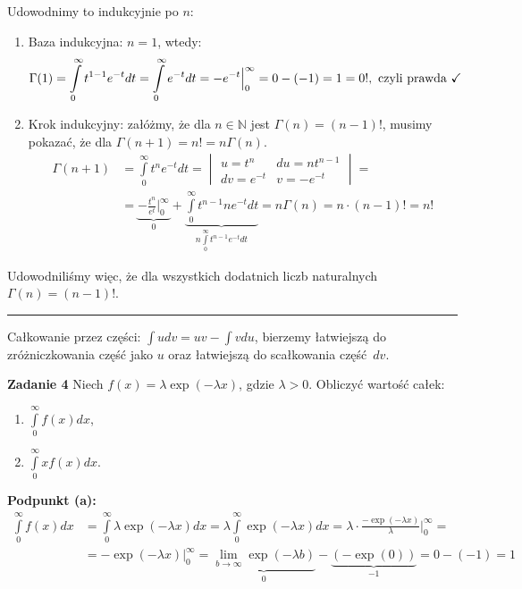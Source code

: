 \documentclass[a4paper,12pt]{article}
\begin{document}
\noindent Udowodnimy to indukcyjnie po $n$:
\begin{enumerate}
    \item Baza indukcyjna: $n=1$, wtedy:
    \[ 
        \Gamma(1) = \int\limits_{0}^{\infty} t^{1-1} e^{-t} dt = 
        \int\limits_{0}^{\infty} e^{-t} dt =
        -e^{-t} \Big{|}_0^\infty = 0 - (-1) = 1 = 0!, \text{ czyli prawda } \checkmark
    \]
    \item Krok indukcyjny: załóżmy, że dla $n \in \mathbb{N}$ jest $\Gamma(n) = (n-1)!$,
          musimy pokazać, że dla $\Gamma(n+1) = n! = n\Gamma(n)$.
    \begin{align*}
        \Gamma(n+1) &= \int\limits_{0}^{\infty} t^{n} e^{-t} dt =
        \begin{vmatrix}
            u = t^n         &   du = nt^{n-1}   \\
            dv = e^{-t}     &   v = -e^{-t}       
        \end{vmatrix} = \\
        &= \underbrace{- \frac{t^n}{e^t} \Big|_0^\infty}_{0}
        + \underbrace{\int\limits_{0}^{\infty} t^{n-1} n e^{-t} dt}_{
            n \int\limits_{0}^{\infty} t^{n-1} e^{-t} dt
        } 
        = n\Gamma(n) = n \cdot (n-1)! = n!
    \end{align*}
\end{enumerate}

\noindent Udowodniliśmy więc, że dla wszystkich dodatnich liczb naturalnych 
$\Gamma(n) = (n-1)!$.

\vspace*{\fill}
\noindent\rule{\textwidth}{1pt}
\noindent Całkowanie przez części: $\int udv = uv - \int vdu$, bierzemy łatwiejszą
do zróżniczkowania część jako $u$ oraz łatwiejszą do scałkowania część $dv$.


\newpage
\noindent \textbf{Zadanie 4} \newline
Niech $f(x) = \lambda \exp (-\lambda x)$, gdzie $\lambda > 0$. Obliczyć wartość całek:
\begin{enumerate}[label=(\alph*)]
    \item $\int\limits_{0}^{\infty} f(x) dx$,
    \item $\int\limits_{0}^{\infty} x f(x) dx$.
\end{enumerate}

\noindent \textbf{Podpunkt (a):}
\begin{align*}
    \int\limits_{0}^{\infty} f(x) dx &= 
        \int\limits_{0}^{\infty} \lambda \exp (-\lambda x) dx =
        \lambda \int\limits_{0}^{\infty} \exp (-\lambda x) dx =
        \lambda \cdot \frac{-\exp(-\lambda x)}{\lambda} \Big|_0^\infty = \\
    &= -\exp(-\lambda x) \Big|_0^\infty =
        \underbrace{\lim\limits_{b \to \infty} \exp(-\lambda b)}_{0} 
        - \underbrace{(-\exp(0))}_{-1} = 0 - (-1) = 1
\end{align*}
\end{document}
